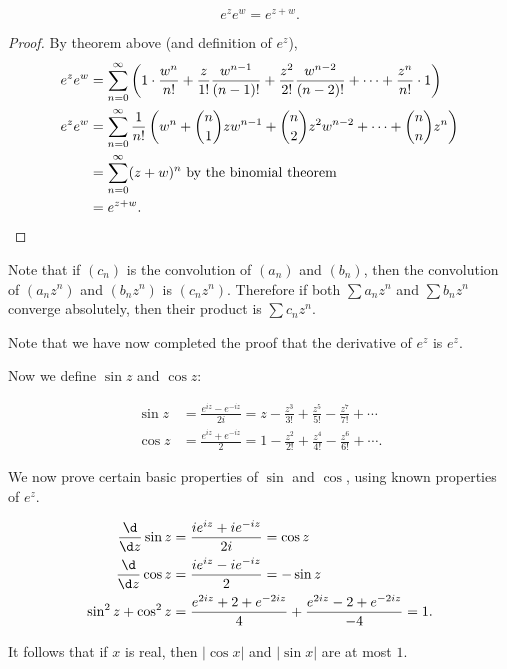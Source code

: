 \documentclass[a4paper]{article}
\begin{document}
\begin{cor}
  \[
    e^z e^w = e^{z + w}.
  \]
\end{cor}

\begin{proof}
  By theorem above (and definition of $e^z$),
  \begin{align*}
    e^z e^w &= \sum_{n = 0}^\infty \left(1\cdot \frac{w^n}{n!} + \frac{z}{1!}\frac{w^{n - 1}}{(n- 1)!} + \frac{z^2}{2!}\frac{w^{n - 2}}{(n- 2)!} + \cdots + \frac{z^{n}}{n!}\cdot 1\right)\\
    e^z e^w &= \sum_{n = 0}^\infty \frac{1}{n!}\left(w^n + \binom{n}{1} zw^{n - 1} + \binom{n}{2}z^2 w^{n - 2} + \cdots + \binom{n}{n}z^n\right)\\
    &= \sum_{n = 0}^\infty (z + w)^n \text{ by the binomial theorem}\\
    &= e^{z + w}. \qedhere
  \end{align*}
\end{proof}
Note that if $(c_n)$ is the convolution of $(a_n)$ and $(b_n)$, then the convolution of $(a_nz^n)$ and $(b_nz^n)$ is $(c_nz^n)$. Therefore if both $\sum a_n z^n$ and $\sum b_nz^n$ converge absolutely, then their product is $\sum c_n z^n$.

Note that we have now completed the proof that the derivative of $e^z$ is $e^z$.

Now we define $\sin z$ and $\cos z$:
\begin{defi}
  \begin{align*}
    \sin z &= \frac{e^{iz} - e^{-iz}}{2i} = z - \frac{z^3}{3!} + \frac{z^5}{5!} - \frac{z^7}{7!} + \cdots\\
    \cos z &= \frac{e^{iz} + e^{-iz}}{2} = 1 - \frac{z^2}{2!} + \frac{z^4}{4!} - \frac{z^6}{6!} + \cdots.
  \end{align*}
\end{defi}

We now prove certain basic properties of $\sin$ and $\cos$, using known properties of $e^z$.
\begin{prop}
  \begin{align*}
    \frac{\d}{\d z}\sin z &= \frac{ie^{iz} + ie^{-iz}}{2i} = \cos z\\
    \frac{\d}{\d z}\cos z &= \frac{ie^{iz} - ie^{-iz}}{2} = -\sin z\\
    \sin^2 z + \cos ^2 z &= \frac{e^{2iz} + 2 + e^{-2iz}}{4} + \frac{e^{2iz} - 2 + e^{-2iz}}{-4} = 1.
  \end{align*}
\end{prop}
It follows that if $x$ is real, then $|\cos x|$ and $|\sin x|$ are at most $1$.
\end{document}
